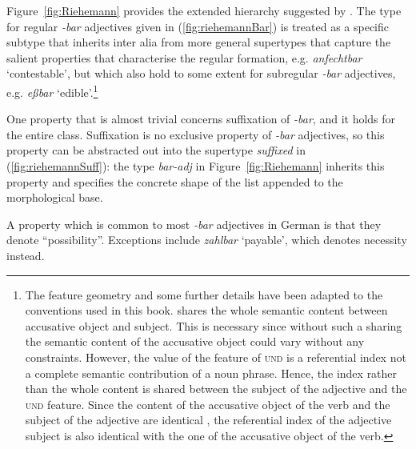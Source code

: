 \documentclass[output=paper
	        ,collection
	        ,collectionchapter
 	        ,biblatex
                ,babelshorthands
                ,newtxmath
                ,draftmode
                ,colorlinks, citecolor=brown
]{langscibook}
\begin{document}
Figure~\ref{fig:Riehemann} provides the extended hierarchy suggested
by \citet{Riehemann98}. The type for regular \textit{-bar} adjectives
given in (\ref{fig:riehemannBar}) is treated as a specific subtype
that inherits inter alia from more general supertypes that capture the
salient properties that characterise the regular formation,
e.g. \textit{anfechtbar} `contestable', but which
also hold to some extent for subregular \textit{-bar} adjectives,
e.g. \textit{eßbar} `edible'.\footnote{%
The feature geometry and some further details have been adapted to the conventions used in this
book. \citet[]{Riehemann98} shares the whole semantic content between accusative object and
subject. This is necessary since without such a sharing the semantic content of the accusative
object could vary without any constraints. However, the value of the feature of \textsc{und} is a
referential index not a complete semantic contribution of a noun phrase. Hence, the index 
rather than the whole content is shared between the subject of the adjective and the \textsc{und}
feature. Since the content of the accusative object of the verb and the subject of the adjective are
identical , the referential index of the adjective subject is also identical with the one of the
accusative object of the verb.
}

  
One property that is almost trivial concerns suffixation of
\textit{-bar}, and it holds for the entire class. Suffixation is no
exclusive property of \textit{-bar} adjectives, so this property can
be abstracted out into the supertype \textit{suffixed} in
(\ref{fig:riehemannSuff}): the type \textit{bar-adj} in
Figure~\ref{fig:Riehemann} inherits this property and specifies the
concrete shape of the list appended to the morphological base.

\ea
	\label{fig:riehemannSuff}
\z


\begin{sloppypar}
  A property which is common to most \textit{-bar} adjectives in
  German is that they denote ``possibility''. Exceptions include
  \textit{zahlbar} `payable', which denotes necessity instead. 
\end{sloppypar}

\begin{exe}
  \ex
\end{exe}
\end{document}
